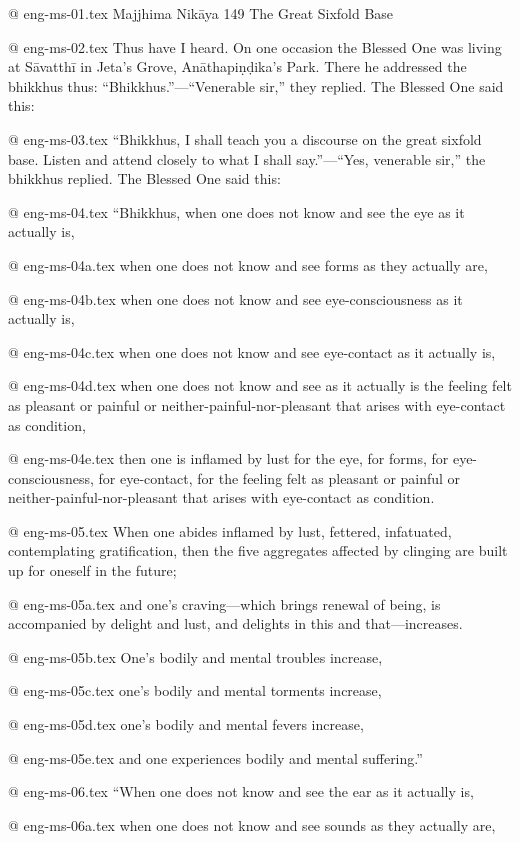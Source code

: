 @ eng-ms-01.tex
Majjhima Nikāya 149
The Great Sixfold Base

@ eng-ms-02.tex
Thus have I heard. On one occasion the Blessed One was living at Sāvatthī in Jeta’s Grove, Anāthapiṇḍika’s Park. There he addressed the bhikkhus thus: “Bhikkhus.”—“Venerable sir,” they replied. The Blessed One said this:

@ eng-ms-03.tex
“Bhikkhus, I shall teach you a discourse on the great sixfold base. Listen and attend closely to what I shall say.”—“Yes, venerable sir,” the bhikkhus replied. The Blessed One said this:

@ eng-ms-04.tex
“Bhikkhus, when one does not know and see the eye as it actually is,

@ eng-ms-04a.tex
when one does not know and see forms as they actually are,

@ eng-ms-04b.tex
when one does not know and see eye-consciousness as it actually is,

@ eng-ms-04c.tex
when one does not know and see eye-contact as it actually is,

@ eng-ms-04d.tex
when one does not know and see as it actually is the feeling felt as pleasant or painful or neither-painful-nor-pleasant that arises with eye-contact as condition,

@ eng-ms-04e.tex
then one is inflamed by lust for the eye, for forms, for eye-consciousness, for eye-contact, for the feeling felt as pleasant or painful or neither-painful-nor-pleasant that arises with eye-contact as condition.

@ eng-ms-05.tex
When one abides inflamed by lust, fettered, infatuated, contemplating gratification, then the five aggregates affected by clinging are built up for oneself in the future;

@ eng-ms-05a.tex
and one’s craving—which brings renewal of being, is accompanied by delight and lust, and delights in this and that—increases.

@ eng-ms-05b.tex
One’s bodily and mental troubles increase,

@ eng-ms-05c.tex
one’s bodily and mental torments increase,

@ eng-ms-05d.tex
one’s bodily and mental fevers increase,

@ eng-ms-05e.tex
and one experiences bodily and mental suffering.”

@ eng-ms-06.tex
“When one does not know and see the ear as it actually is,

@ eng-ms-06a.tex
when one does not know and see sounds as they actually are,

